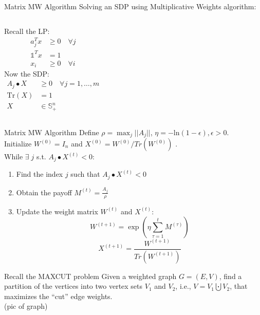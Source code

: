 \documentclass{beamer}
\begin{document}
\begin{frame}{Matrix MW Algorithm}
Solving an SDP using Multiplicative Weights algorithm: \\ \vspace{.5cm}
\begin{columns}[T]
Recall the LP: 
\begin{align*}
a_j^Tx &\geq 0 \quad \forall j \\
\mathds{1}^Tx &= 1 \\
x_i &\geq 0 \quad \forall i
\end{align*}
Now the SDP:
\begin{align*}
A_j \bullet X &\geq 0 \quad \forall j = 1,\ldots,m \\
\text{Tr}(X) &= 1 \\
X & \in \mathbb S_+^n
\end{align*}
\end{columns}
\end{frame}


\begin{frame}{Matrix MW Algorithm}
Define $\rho = \max_j ||A_j||$, $\eta = -\text{ln}(1-\epsilon), \epsilon > 0$. \\ \vspace{.5cm}
Initialize $W^{(0)} = I_n$ \quad and $X^{(0)} = W^{(0)}/Tr(W^{(0)})$ . \\ \vspace{.5cm}
While $\exists \; j$ s.t. $A_j \bullet X^{(t)} < 0$:
\begin{enumerate}
\setlength\itemsep{1.2em}
\item Find the index $j$ such that $A_j \bullet X^{(t)} < 0$
\item Obtain the payoff $M^{(t)} = \frac{A_j}{\rho}$
\item Update the weight matrix $W^{(t)}$ and $X^{(t)}$:
$$ W^{(t+1)} = \exp \left(\eta \sum_{\tau =1}^t M^{(\tau)}\right)$$
$$
X^{(t+1)} = \frac{W^{(t+1)}}{Tr(W^{(t+1)})}
$$
\end{enumerate}
\end{frame}

\begin{frame}{Recall the MAXCUT problem}
Given a weighted graph $G = (E, V)$, find a partition of the vertices into two vertex sets $V_1$ and $V_2$, i.e., $V = V_1\bigcupdot V_2$, that maximizes the ``cut'' edge weights.\\
\vspace{2cm}
(pic of graph)
\end{frame}
\end{document}
